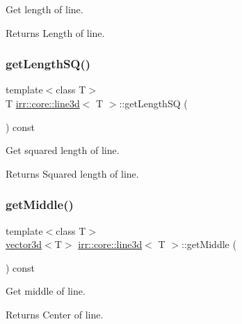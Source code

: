 Get length of line. 

\begin{DoxyReturn}{Returns}
Length of line. 
\end{DoxyReturn}
\mbox{\label{classirr_1_1core_1_1line3d_a4754398992c5922efe33cad0bf773ddc}} 
\subsubsection{\texorpdfstring{get\+Length\+S\+Q()}{getLengthSQ()}}
{\footnotesize\ttfamily template$<$class T$>$ \\
T \hyperlink{classirr_1_1core_1_1line3d}{irr\+::core\+::line3d}$<$ T $>$\+::get\+Length\+SQ (\begin{DoxyParamCaption}{ }\end{DoxyParamCaption}) const\hspace{0.3cm}{\ttfamily [inline]}}



Get squared length of line. 

\begin{DoxyReturn}{Returns}
Squared length of line. 
\end{DoxyReturn}
\mbox{\label{classirr_1_1core_1_1line3d_a14d8d80862836da4ecf51db9dcab95ee}} 
\subsubsection{\texorpdfstring{get\+Middle()}{getMiddle()}}
{\footnotesize\ttfamily template$<$class T$>$ \\
\hyperlink{classirr_1_1core_1_1vector3d}{vector3d}$<$T$>$ \hyperlink{classirr_1_1core_1_1line3d}{irr\+::core\+::line3d}$<$ T $>$\+::get\+Middle (\begin{DoxyParamCaption}{ }\end{DoxyParamCaption}) const\hspace{0.3cm}{\ttfamily [inline]}}



Get middle of line. 

\begin{DoxyReturn}{Returns}
Center of line. 
\end{DoxyReturn}
\mbox{\label{classirr_1_1core_1_1line3d_a8df2350580b6be884b6f6d48c8932795}} 
